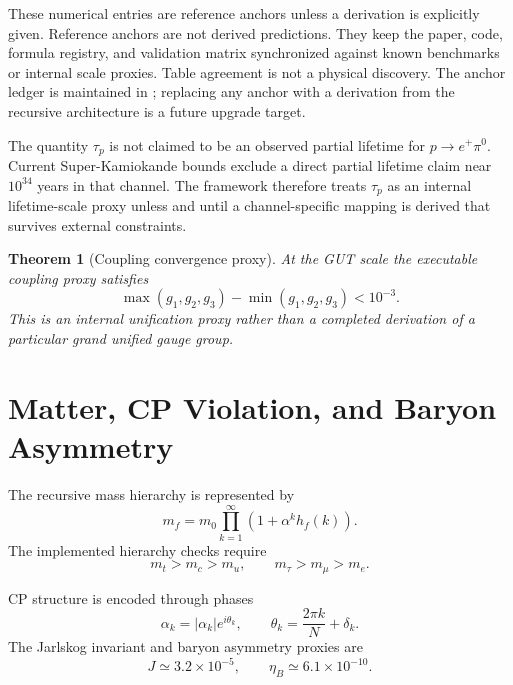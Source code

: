 \documentclass[12pt]{article}
\newtheorem{theorem}{Theorem}[section]
\theoremstyle{remark}
\begin{document}
These numerical entries are reference anchors unless a derivation is explicitly
given.  Reference anchors are not derived predictions.  They keep the paper,
code, formula registry, and validation matrix synchronized against known
benchmarks or internal scale proxies.  Table agreement is not a physical
discovery.  The anchor ledger is maintained in
; replacing any anchor with a derivation from
the recursive architecture is a future upgrade target.

The quantity $\tau_p$ is not claimed to be an observed partial lifetime for
$p\to e^+\pi^0$.  Current Super-Kamiokande bounds exclude a direct partial
lifetime claim near $10^{34}$ years in that channel.  The framework therefore
treats $\tau_p$ as an internal lifetime-scale proxy unless and until a
channel-specific mapping is derived that survives external constraints.

\begin{theorem}[Coupling convergence proxy]
At the GUT scale the executable coupling proxy satisfies
\begin{equation}
  \max(g_1,g_2,g_3)-\min(g_1,g_2,g_3)<10^{-3}.
\end{equation}
This is an internal unification proxy rather than a completed derivation of a
particular grand unified gauge group.
\end{theorem}

\section{Matter, CP Violation, and Baryon Asymmetry}

The recursive mass hierarchy is represented by
\begin{equation}
  m_f =
  m_0\prod_{k=1}^{\infty}(1+\alpha^k h_f(k)).
  \label{eq:mass}
\end{equation}
The implemented hierarchy checks require
\begin{equation}
  m_t>m_c>m_u,
  \qquad
  m_{\tau}>m_{\mu}>m_e.
\end{equation}

CP structure is encoded through phases
\begin{equation}
  \alpha_k=|\alpha_k|e^{i\theta_k},
  \qquad
  \theta_k=\frac{2\pi k}{N}+\delta_k.
\end{equation}
The Jarlskog invariant and baryon asymmetry proxies are
\begin{equation}
  J\simeq3.2\times10^{-5},
  \qquad
  \eta_B\simeq6.1\times10^{-10}.
\end{equation}
\end{document}
